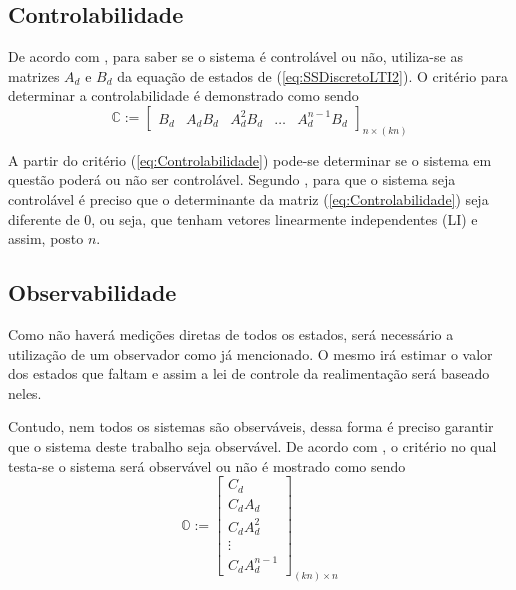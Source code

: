 \subsection{Controlabilidade}

De acordo com \cite{Hespanha}, para saber se o sistema é controlável ou não, utiliza-se as matrizes $A_d$ e $B_d$ da equação de estados de (\ref{eq:SSDiscretoLTI2}). O critério para determinar a controlabilidade é demonstrado como sendo
\begin{equation}\label{eq:Controlabilidade}
\mathbb{C} := \left[\begin{array}{ccccc}
        B_d & A_dB_d & A_d^2B_d & \dots & A_d^{n-1}B_d
     \end{array}\right]_{n\times(kn)} 
\end{equation}{}

A partir do critério (\ref{eq:Controlabilidade}) pode-se determinar se o sistema em questão poderá ou não ser controlável. Segundo \cite{Ogata}, para que o sistema seja controlável é preciso que o determinante da matriz (\ref{eq:Controlabilidade}) seja diferente de $0$, ou seja, que tenham vetores linearmente independentes (LI) e assim, posto $n$.

\subsection{Observabilidade}

Como não haverá medições diretas de todos os estados, será necessário a utilização de um observador como já mencionado. O mesmo irá estimar o valor dos estados que faltam e assim a lei de controle da realimentação será baseado neles. 

Contudo, nem todos os sistemas são observáveis, dessa forma é preciso garantir que o sistema deste trabalho seja observável. De acordo com \cite{Hespanha}, o critério no qual testa-se o sistema será observável ou não é mostrado como sendo
\begin{equation}\label{eq:Observabilidade}
\mathbb{O} := \left[\begin{array}{c}
        C_d ~ \\ C_dA_d ~ \\ C_dA_d^2 ~ \\ \vdots ~ \\ C_dA_d^{n-1}
    \end{array}\right]_{(kn) \times n}
\end{equation}\\

